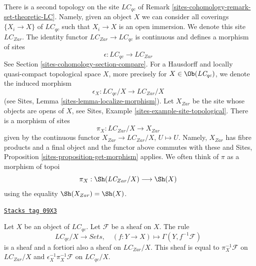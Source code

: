 There is a second topology on the site $\textit{LC}_{qc}$ of
Remark \ref{sites-cohomology-remark-set-theoretic-LC}. Namely, given an object
$X$ we can consider all coverings $\{X_i \to X\}$ of $\textit{LC}_{qc}$
such that $X_i \to X$ is an open immersion. We denote this site
$\textit{LC}_{Zar}$. The identity functor
$\textit{LC}_{Zar} \to \textit{LC}_{qc}$ is continuous and defines
a morphism of sites
$$
\epsilon : \textit{LC}_{qc} \longrightarrow \textit{LC}_{Zar}
$$
See Section \ref{sites-cohomology-section-compare}.
For a Hausdorff and locally quasi-compact topological space $X$, more
precisely for $X \in \Ob(\textit{LC}_{qc})$, we denote the induced morphism
$$
\epsilon_X : \textit{LC}_{qc}/X \longrightarrow \textit{LC}_{Zar}/X
$$
(see Sites, Lemma \ref{sites-lemma-localize-morphism}).
Let $X_{Zar}$ be the site whose objects are opens of $X$, see
Sites, Example \ref{sites-example-site-topological}.
There is a morphism of sites
$$
\pi_X : \textit{LC}_{Zar}/X \longrightarrow X_{Zar}
$$
given by the continuous functor
$X_{Zar} \to \textit{LC}_{Zar}/X$, $U \mapsto U$.
Namely, $X_{Zar}$ has fibre products and a final object and the
functor above commutes with these and
Sites, Proposition \ref{sites-proposition-get-morphism} applies.
We often think of $\pi$ as a morphism of topoi
$$
\pi_X : \Sh(\textit{LC}_{Zar}/X) \longrightarrow \Sh(X)
$$
using the equality $\Sh(X_{Zar}) = \Sh(X)$.

\begin{lemma}
\label{sites-cohomology-lemma-describe-pullback-pi}
\href{https://stacks.math.columbia.edu/tag/09X3}{\texttt{Stacks tag 09X3}}

Let $X$ be an object of $\textit{LC}_{qc}$. Let $\mathcal{F}$ be a
sheaf on $X$. The rule
$$
\textit{LC}_{qc}/X \longrightarrow \textit{Sets},\quad
(f : Y \to X) \longmapsto \Gamma(Y, f^{-1}\mathcal{F})
$$
is a sheaf and a fortiori also a sheaf on $\textit{LC}_{Zar}/X$.
This sheaf is equal to
$\pi_X^{-1}\mathcal{F}$ on $\textit{LC}_{Zar}/X$ and
$\epsilon_X^{-1}\pi_X^{-1}\mathcal{F}$ on $\textit{LC}_{qc}/X$.
\end{lemma}

